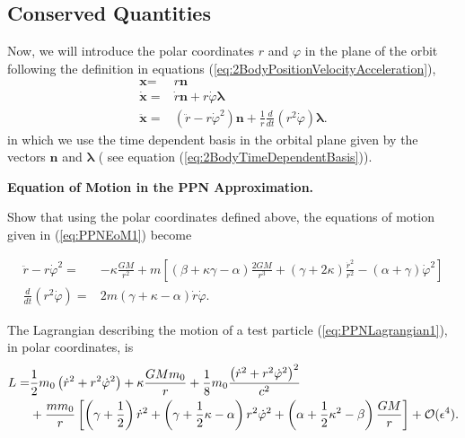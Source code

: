 \subsection{Conserved Quantities}
Now, we will introduce the polar coordinates $r$ and $\varphi$ in the plane of the orbit following the definition in equations (\ref{eq:2BodyPositionVelocityAcceleration}),
\begin{subequations}
\begin{align}
\textbf{x} =& r \textbf{n} \\
\dot{ \textbf{x}} =& \dot{r} \textbf{n} + r \dot{\varphi} \boldsymbol{\lambda}  \\
\ddot{ \textbf{x}} =& \left( \ddot{r} - r \dot{\varphi} ^2 \right) \textbf{n} + \frac{1}{r} \frac{d}{dt} \left( r^2 \dot{\varphi} \right) \boldsymbol{\lambda}.
\end{align}
\end{subequations}
in which we use the time dependent basis in the orbital plane given by the vectors $\textbf{n}$ and $\boldsymbol{\lambda}$ ( see equation (\ref{eq:2BodyTimeDependentBasis})).

\begin{exercise}
\textbf{Equation of Motion in the PPN Approximation.}

Show that using the polar coordinates defined above, the equations of motion given in (\ref{eq:PPNEoM1}) become
\begin{small}
\begin{subequations}\label{eq:PPNEoM2}
\begin{align}
\ddot{r}  - r \dot{\varphi}^2= &  -\kappa  \frac{GM}{r^2} + m \left[  \left( \beta + \kappa \gamma - \alpha \right) \frac{2GM}{r^3}  + \left( \gamma + 2\kappa \right) \frac{\dot{r}^2}{r^2} - \left( \alpha + \gamma \right) \dot{\varphi}^2 \right] \\
\frac{d}{dt} \left( r^2 \dot{\varphi} \right) = & 2m( \gamma + \kappa - \alpha ) \dot{r} \dot{\varphi} .
\end{align}
\end{subequations}
\end{small}
\end{exercise}

The Lagrangian describing the motion of a test particle (\ref{eq:PPNLagrangian1}), in polar coordinates, is
\begin{align}
L = & \frac{1}{2} m_0 \left( \dot{r}^2 + r^2 \dot{\varphi}^2 \right) + \kappa \frac{GMm_0}{r} + \frac{1}{8} m_0 \frac{\left( \dot{r}^2 + r^2 \dot{\varphi}^2 \right)^2}{c^2} \notag \\
& + \frac{m m_0}{r} \left[ \left( \gamma + \frac{1}{2} \right)  \dot{r}^2 + \left( \gamma + \frac{1}{2}\kappa - \alpha \right) r^2 \dot{\varphi}^2  +  \left(\alpha + \frac{1}{2} \kappa^2 -\beta \right) \frac{GM}{r} \right] + \mathcal{O} ( \epsilon ^4 ).
\end{align}

